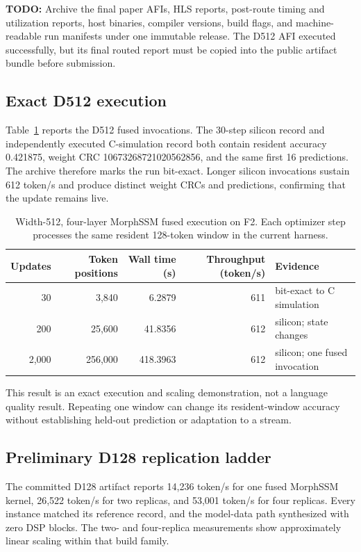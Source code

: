 \documentclass[10pt]{article}
\newcommand{\todo}[1]{\textcolor{red!70!black}{\textbf{TODO:} #1}}
\begin{document}
\todo{Archive the final paper AFIs, HLS reports, post-route timing and
utilization reports, host binaries, compiler versions, build flags, and
machine-readable run manifests under one immutable release.  The D512 AFI
executed successfully, but its final routed report must be copied into the
public artifact bundle before submission.}

\subsection{Exact D512 execution}

Table~\ref{tab:d512} reports the D512 fused invocations.  The 30-step silicon
record and independently executed C-simulation record both contain resident
accuracy 0.421875, weight CRC 10673268721020562856, and the same first 16
predictions.  The archive therefore marks the run bit-exact.  Longer silicon
invocations sustain 612 token/s and produce distinct weight CRCs and
predictions, confirming that the update remains live.

\begin{table}[t]
\centering
\caption{Width-512, four-layer MorphSSM fused execution on F2.  Each optimizer
step processes the same resident 128-token window in the current harness.}
\label{tab:d512}
\small
\begin{tabular}{rrrrl}
\toprule
Updates & Token positions & Wall time (s) & Throughput (token/s) & Evidence \\
\midrule
30   & 3,840   & 6.2879   & 611 & bit-exact to C simulation \\
200  & 25,600  & 41.8356  & 612 & silicon; state changes \\
2,000& 256,000 & 418.3963 & 612 & silicon; one fused invocation \\
\bottomrule
\end{tabular}
\end{table}

This result is an exact execution and scaling demonstration, not a language
quality result.  Repeating one window can change its resident-window accuracy
without establishing held-out prediction or adaptation to a stream.

\subsection{Preliminary D128 replication ladder}

The committed D128 artifact reports 14,236 token/s for one fused MorphSSM
kernel, 26,522 token/s for two replicas, and 53,001 token/s for four replicas.
Every instance matched its reference record, and the model-data path synthesized
with zero DSP blocks.  The two- and four-replica measurements show approximately
linear scaling within that build family.
\end{document}
